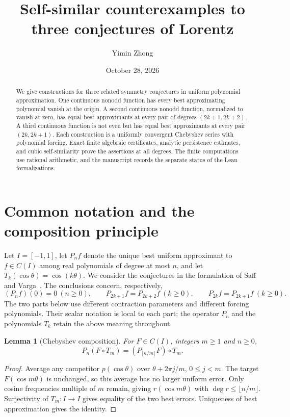 \documentclass[11pt]{article}
\title{Self-similar counterexamples to three conjectures of Lorentz}
\author{Yimin Zhong}
\date{October 28, 2026}
\newtheorem{lemma}[theorem]{Lemma}
\theoremstyle{remark}\newtheorem{remark}[theorem]{Remark}
\begin{document}
\maketitle
\begin{abstract}
We give constructions for three related symmetry conjectures in uniform
polynomial approximation. One continuous nonodd function has every best
approximating polynomial vanish at the origin. A second continuous nonodd
function, normalized to vanish at zero, has equal best approximants at every
pair of degrees $(2k+1,2k+2)$. A third continuous function is not even but has
equal best approximants at every pair $(2k,2k+1)$. Each construction is a
uniformly convergent Chebyshev series with polynomial forcing. Exact finite
algebraic certificates, analytic persistence estimates, and cubic
self-similarity prove the assertions at all degrees. The finite computations
use rational arithmetic, and the manuscript records the separate status of
the Lean formalizations.
\end{abstract}
\tableofcontents

\section{Common notation and the composition principle}
Let $I=[-1,1]$, let $P_n f$ denote the unique best uniform approximant to
$f\in C(I)$ among real polynomials of degree at most $n$, and let
$T_k(\cos\theta)=\cos(k\theta)$. We consider the conjectures in the
formulation of Saff and Varga~\cite{SaffVarga}.
The conclusions concern, respectively,
\[
 (P_n f)(0)=0\ (n\ge0),\qquad
 P_{2k+1}f=P_{2k+2}f\ (k\ge0),\qquad
 P_{2k}f=P_{2k+1}f\ (k\ge0).
\]
The two parts below use different contraction parameters and different
forcing polynomials. Their scalar notation is local to each part; the
operator $P_n$ and the polynomials $T_k$ retain the above meaning throughout.

\begin{lemma}[Chebyshev composition]\label{lem:composition}
For $F\in C(I)$, integers $m\ge1$ and $n\ge0$,
\[
 P_n(F\circ T_m)=(P_{\lfloor n/m\rfloor}F)\circ T_m.
\]
\end{lemma}
\begin{proof}
Average any competitor $p(\cos\theta)$ over
$\theta+2\pi j/m$, $0\le j<m$. The target $F(\cos m\theta)$ is unchanged,
so this average has no larger uniform error. Only cosine frequencies
multiple of $m$ remain, giving $r(\cos m\theta)$ with
$\deg r\le\lfloor n/m\rfloor$. Surjectivity of $T_m:I\to I$ gives equality
of the two best errors. Uniqueness of best approximation gives the identity.
\end{proof}
\end{document}
